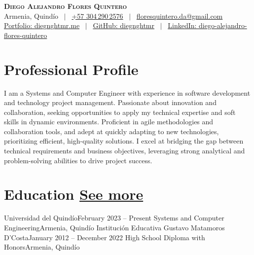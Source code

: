 \documentclass[letterpaper,12pt]{fed-res} %
\begin{document}
\begin{center}
    \textbf{\Huge \scshape Diego Alejandro Flores Quintero} \\ \vspace{1pt}
    Armenia, Quindío \ $|$ \
    \href{http://wa.me/+573042902576}{+57 304\,290\,2576} \ $|$ \
    \href{mailto:floresquintero.da@gmail.com}{floresquintero.da@gmail.com} \\[1pt]
    \href{https://www.diegnghtmr.me}{Portfolio: diegnghtmr.me} \ $|$ \
    \href{https://github.com/diegnghtmr}{GitHub: diegnghtmr} \ $|$ \
    \href{https://www.linkedin.com/in/diego-alejandro-flores-quintero/}{LinkedIn: diego-alejandro-flores-quintero}
\end{center}


\section{Professional Profile}
I am a Systems and Computer Engineer with experience in software development and technology project management. Passionate about innovation and collaboration, seeking opportunities to apply my technical expertise and soft skills in dynamic environments. Proficient in agile methodologies and collaboration tools, and adept at quickly adapting to new technologies, prioritizing efficient, high-quality solutions. I excel at bridging the gap between technical requirements and business objectives, leveraging strong analytical and problem-solving abilities to drive project success.

\section{Education \hfill \href{https://drive.google.com/file/d/1kLhohN7wZ5CUUInGaCufAVVTFeoeSNWb/view?usp=sharing}{See more}}
    \resumeSubHeadingListStart
        \resumeSubheading
            {Universidad del Quindío}{February 2023 -- Present}
            {Systems and Computer Engineering}{Armenia, Quindío}
        \resumeSubheading
            {Institución Educativa Gustavo Matamoros D'Costa}{January 2012 -- December 2022}
            {High School Diploma with Honors}{Armenia, Quindío}
    \resumeSubHeadingListEnd
\end{document}
